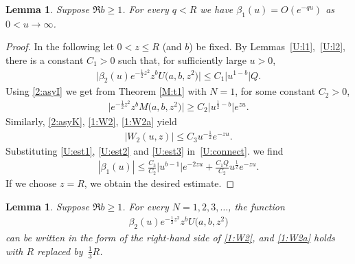 \documentclass[pdftex]{sigma}
\numberwithin{equation}{section}
\newtheorem{Lemma}[Theorem]{Lemma}
{ \theoremstyle{definition}
\newtheorem{Remarks}[Theorem]{Remarks} }
\begin{document}
\begin{Lemma}\label{U:l3}
Suppose $\Re b\ge 1$. For every $q<R$ we have $\beta_1(u)=O(e^{-qu})$ as $0<u\to\infty$.
\end{Lemma}

\begin{proof}
In the following let $0<z\le R$ (and $b$) be f\/ixed.
By Lemmas~\ref{U:l1},~\ref{U:l2}, there is a constant $C_1>0$ such that, for suf\/f\/iciently large $u>0$,
\begin{gather}\label{U:est1}
 \big|\beta_2(u) e^{-\frac12z^2}z^bU\big(a,b,z^2\big)\big| \le C_1\big|u^{1-b}\big| Q .
\end{gather}
Using \eqref{2:asyI}
we get from Theorem \ref{M:t1} with $N=1$, for some constant $C_2>0$,
\begin{gather}\label{U:est2}
 \big|e^{-\frac12z^2} z^bM\big(a,b,z^2\big)\big|\ge C_2 \big|u^{\frac12-b}\big|e^{zu} .
\end{gather}
Similarly, \eqref{2:asyK},
\eqref{1:W2}, \eqref{1:W2a} yield
\begin{gather}\label{U:est3}
 |W_2(u,z)|\le C_3 u^{-\frac12}e^{-zu} .
\end{gather}
Substituting \eqref{U:est1}, \eqref{U:est2} and \eqref{U:est3} in~\eqref{U:connect}.
we f\/ind
\begin{gather*}
|\beta_1(u)|\le \frac{C_3}{C_2} \big|u^{b-1}\big|e^{-2zu}+\frac{C_1Q}{C_2}u^{\frac12}e^{-zu}.
\end{gather*}
If we choose $z=R$, we obtain the desired estimate.
\end{proof}

\begin{Lemma}\label{U:l4}
Suppose $\Re b\ge 1$. For every $N=1,2,3,\dots$, the function
\begin{gather*}%
 \beta_2(u)e^{-\frac12z^2}z^b U\big(a,b,z^2\big)
\end{gather*}
can be written in the form of the right-hand side of \eqref{1:W2}, and \eqref{1:W2a} holds with $R$ replaced by~$\frac13 R$.
\end{Lemma}
\end{document}
